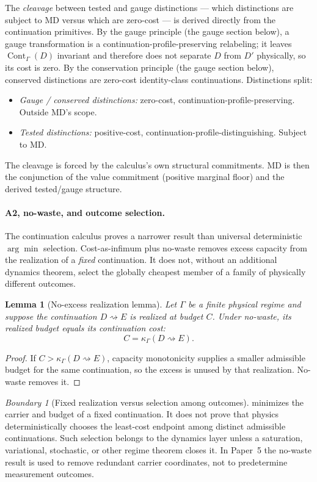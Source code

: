 \documentclass[11pt]{article}
\newtheorem{lemma}[theorem]{Lemma}
\theoremstyle{remark}
\newtheorem{warning}[theorem]{Boundary}
\newcommand{\G}{\Gamma}
\newcommand{\goes}{\rightsquigarrow}
\newcommand{\Cont}{\operatorname{Cont}}
\newcommand{\Cost}{\kappa}
\begin{document}
The \emph{cleavage} between tested and gauge distinctions --- which distinctions are subject to MD versus which are zero-cost --- is derived directly from the continuation primitives.  By the gauge principle (the gauge section below), a gauge transformation is a continuation-profile-preserving relabeling; it leaves $\Cont_\G(D)$ invariant and therefore does not separate $D$ from $D'$ physically, so its cost is zero.  By the conservation principle (the gauge section below), conserved distinctions are zero-cost identity-class continuations.  Distinctions split:
\begin{itemize}
\item \emph{Gauge / conserved distinctions:} zero-cost, continuation-profile-preserving.  Outside MD's scope.
\item \emph{Tested distinctions:} positive-cost, continuation-profile-distinguishing.  Subject to MD.
\end{itemize}
The cleavage is forced by the calculus's own structural commitments.  MD is then the conjunction of the value commitment (positive marginal floor) and the derived tested/gauge structure.

\paragraph{A2, no-waste, and outcome selection.}
The continuation calculus proves a narrower result than universal deterministic \(\arg\min\) selection.  Cost-as-infimum plus no-waste removes excess capacity from the realization of a \emph{fixed} continuation.  It does not, without an additional dynamics theorem, select the globally cheapest member of a family of physically different outcomes.

\begin{lemma}[No-excess realization lemma]\label{lem:no-excess}
Let \(\G\) be a finite physical regime and suppose the continuation \(D\goes E\) is realized at budget \(C\).  Under no-waste, its realized budget equals its continuation cost:
\[
        C=\Cost_\G(D\goes E).
\]
\end{lemma}
\begin{proof}
If \(C>\Cost_\G(D\goes E)\), capacity monotonicity supplies a smaller admissible budget for the same continuation, so the excess is unused by that realization.  No-waste removes it.
\end{proof}

\begin{warning}[Fixed realization versus selection among outcomes]
 minimizes the carrier and budget of a fixed continuation.  It does not prove that physics deterministically chooses the least-cost endpoint among distinct admissible continuations.  Such selection belongs to the dynamics layer unless a saturation, variational, stochastic, or other regime theorem closes it.  In Paper~5 the no-waste result is used to remove redundant carrier coordinates, not to predetermine measurement outcomes.
\end{warning}
\end{document}
